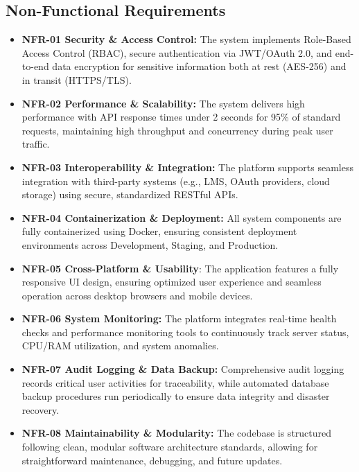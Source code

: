 \subsection{Non-Functional Requirements}

\begin{itemize}
  \item \textbf{NFR-01 Security \& Access Control:} The system implements Role-Based Access Control (RBAC), secure authentication via JWT/OAuth 2.0, and end-to-end data encryption for sensitive information both at rest (AES-256) and in transit (HTTPS/TLS).
  \item \textbf{NFR-02 Performance \& Scalability:} The system delivers high performance with API response times under 2 seconds for 95\% of standard requests, maintaining high throughput and concurrency during peak user traffic.
  \item \textbf{NFR-03 Interoperability \& Integration:} The platform supports seamless integration with third-party systems (e.g., LMS, OAuth providers, cloud storage) using secure, standardized RESTful APIs.
  \item \textbf{NFR-04 Containerization \& Deployment:} All system components are fully containerized using Docker, ensuring consistent deployment environments across Development, Staging, and Production.
  \item \textbf{NFR-05 Cross-Platform \& Usability}: The application features a fully responsive UI design, ensuring optimized user experience and seamless operation across desktop browsers and mobile devices.
  \item \textbf{NFR-06 System Monitoring:} The platform integrates real-time health checks and performance monitoring tools to continuously track server status, CPU/RAM utilization, and system anomalies.
  \item \textbf{NFR-07 Audit Logging \& Data Backup:} Comprehensive audit logging records critical user activities for traceability, while automated database backup procedures run periodically to ensure data integrity and disaster recovery.
  \item \textbf{NFR-08 Maintainability \& Modularity:} The codebase is structured following clean, modular software architecture standards, allowing for straightforward maintenance, debugging, and future updates.
\end{itemize}
